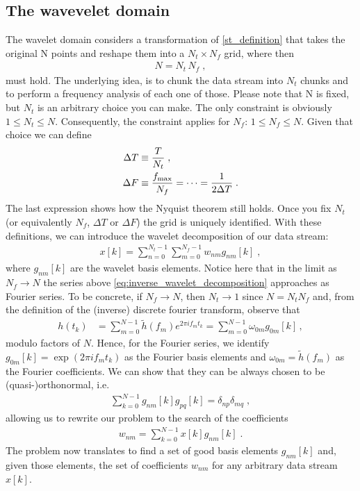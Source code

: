 \documentclass{article}
\begin{document}
\subsection{The wavevelet domain}\label{sec:wavelet_domain}
The wavelet domain considers a transformation of \eqref{st_definition} that takes the original N points and reshape them into a $N_t\times N_f$ grid, where then
\begin{align}\label{NtNf_def}
N=N_t\,N_f\;,
\end{align}
must hold. The underlying idea, is to chunk the data stream into $N_t$ chunks and to perform a frequency analysis of each one of those. Please note that N is fixed, but $N_t$ is an arbitrary choice you can make. The only constraint is obviously $1\le N_t\le N$. Consequently, the constraint applies for $N_f$: $1\le N_f\le N$.
Given that choice we can define
\begin{align}\label{DTDF}
\Delta T&\equiv\frac{T}{N_t}\;,\nonumber\\
\Delta F&\equiv\frac{f_{\rm max}}{N_f}=\dots=\frac{1}{2\Delta T}\;.
\end{align}
The last expression shows how the Nyquist theorem still holds. Once you fix $N_t$ (or equivalently $N_f$, $\Delta T$ or $\Delta F$) the grid is uniquely identified.
With these definitions, we can introduce the wavelet decomposition of our data stream:
\begin{align}
\label{eq:inverse_wavelet_decomposition}
x[k]=\sum_{n=0}^{N_t-1}\sum_{m=0}^{N_f-1}w_{nm}g_{nm}[k]\;,
\end{align}
where $g_{nm}[k]$ are the wavelet basis elements. Notice here that in the limit as $N_{f}\rightarrow N$ the series above \eqref{eq:inverse_wavelet_decomposition} approaches as Fourier series. To be concrete, if $N_{f} \rightarrow N$, then $N_{t}\rightarrow 1$ since $N = N_{t}N_{f}$ and, from the definition of the (inverse) discrete fourier transform, observe that 
\begin{align}
h(t_{k}) &= \sum_{m = 0}^{N -1}\tilde{h}(f_{m})e^{2\pi i f_{m}t_{k}} = \sum_{m = 0}^{N - 1}\omega_{0m}g_{0m}[k]\, ,\nonumber
\end{align}
modulo factors of $N$. Hence, for the Fourier series, we identify $g_{0m}[k] = \exp(2\pi i f_{m}t_{k})$ as the Fourier basis elements and $\omega_{0m} = \tilde{h}(f_{m})$ as the Fourier coefficients. We can show that they can be always chosen to be (quasi-)orthonormal, i.e.
\begin{align}
\label{eq:orthonormality}
\sum_{k=0}^{N-1}g_{nm}[k]g_{pq}[k]=\delta_{np}\delta_{mq}\;,
\end{align}
allowing us to rewrite our problem to the search of the coefficients
\begin{align}\label{wnm_def}
w_{nm}=\sum_{k=0}^{N-1}x[k]g_{nm}[k]\;.
\end{align}
The problem now translates to find a set of good basis elements $g_{nm}[k]$ and, given those elements, the set of coefficients $w_{nm}$ for any arbitrary data stream $x[k]$.
\end{document}
